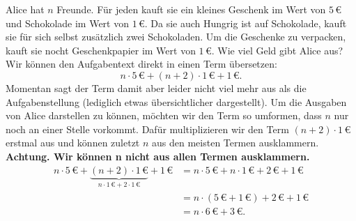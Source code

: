 \documentclass[../../main.tex]{subfiles}
\begin{document}
	\begin{example}{}
		Alice hat $n$ Freunde. Für jeden kauft sie ein kleines Geschenk im Wert von $5\,\euro{}$ und Schokolade im Wert von $1\,\euro{}$.
		Da sie auch Hungrig ist auf Schokolade, kauft sie für sich selbst zusätzlich zwei Schokoladen. Um die Geschenke zu verpacken, kauft sie
		nocht Geschenkpapier im Wert von $1\,\euro{}$. Wie viel Geld gibt Alice aus?\\[.5em]
		Wir können den Aufgabentext direkt in einen Term übersetzen:
		\[n\cdot 5\,\euro{}+(n+2)\cdot 1\,\euro{} + 1\,\euro{}.\]
		Momentan sagt der Term damit aber leider nicht viel mehr aus als die Aufgabenstellung (lediglich etwas übersichtlicher dargestellt).
		Um die Ausgaben von Alice darstellen zu können, möchten wir den Term so umformen, dass $n$ nur noch an einer Stelle vorkommt.
		Dafür multiplizieren wir den Term $(n+2)\cdot 1\,\euro{}$ erstmal aus und können zuletzt $n$ aus den meisten Termen ausklammern.
		\textbf{Achtung. Wir können n nicht aus allen Termen ausklammern.}
		\begin{align*}
			n\cdot 5\,\euro{} + \underbrace{(n+2)\cdot 1\,\euro{}}_{n\cdot 1\,\euro{}+2\cdot 1\,\euro{}} + 1\,\euro{} &= n\cdot 5\,\euro{}+n\cdot 1\,\euro{} + 2\,\euro{}+1\,\euro{}\\
			 &= n\cdot(5\,\euro{}+1\,\euro{})+2\,\euro{}+1\,\euro{}\\
			 &= n\cdot 6\,\euro{} + 3\,\euro{}.
		\end{align*}
	\end{example}
\end{document}
